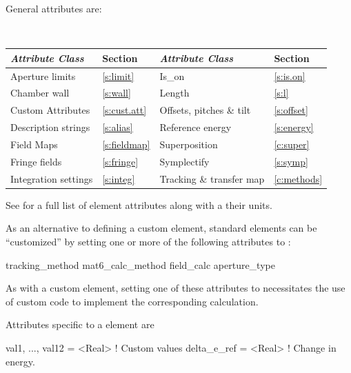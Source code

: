 General  attributes are:
\begin{center}
\tt
\begin{tabular}{llll} \toprule
  {\sl Attribute Class}      & Section           & {\sl Attribute Class}      & Section         \\ \midrule
  Aperture limits            & \ref{s:limit}     & Is_on                      & \ref{s:is.on}   \\
  Chamber wall               & \ref{s:wall}      & Length                     & \ref{s:l}       \\
  Custom Attributes          & \ref{s:cust.att}  & Offsets, pitches \& tilt   & \ref{s:offset}  \\
  Description strings        & \ref{s:alias}     & Reference energy           & \ref{s:energy}  \\ 
  Field Maps                 & \ref{s:fieldmap}  & Superposition              & \ref{c:super}   \\
  Fringe fields              & \ref{s:fringe}    & Symplectify                & \ref{s:symp}    \\
  Integration settings       & \ref{s:integ}     & Tracking \& transfer map   & \ref{c:methods} \\ 
  \bottomrule
\end{tabular}
\end{center}
\toffset
See  for a full list of element attributes along with a their units.

As an alternative to defining a custom element, standard elements can
be ``customized'' by setting one or more of the following attributes
to :
\begin{example}
  tracking_method       
  mat6_calc_method      
  field_calc            
  aperture_type         
\end{example}

As with a custom element, setting one of these attributes to
 necessitates the use of custom code to implement the
corresponding calculation.

Attributes specific to a  element are
\begin{example}
  val1, ..., val12 = <Real>  ! Custom values 
  delta_e_ref      = <Real>  ! Change in energy.
\end{example}

